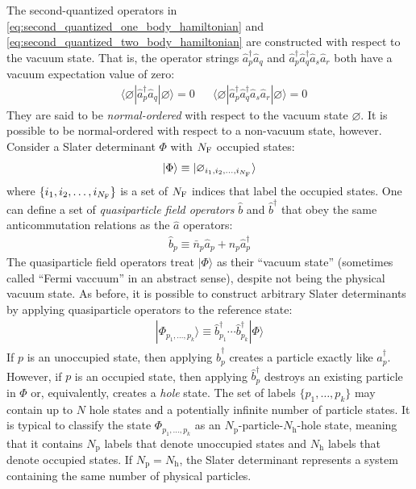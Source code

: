 \documentclass[amsmath, amssymb, aps, floatfix, nofootinbib, preprintnumbers,showpacs, superscriptaddress, twocolumn]{revtex4-1}
\newcommand{\ket}[1]{| #1 \rangle}
\newcommand{\bra}[1]{\langle #1 |}
\begin{document}
The second-quantized operators in \eqref{eq:second_quantized_one_body_hamiltonian} and \eqref{eq:second_quantized_two_body_hamiltonian} are constructed with respect to the vacuum state.  That is, the operator strings $\hat{a}_p^\dagger \hat{a}_q$ and $\hat{a}_p^\dagger \hat{a}_q^\dagger \hat{a}_s \hat{a}_r$ both have a vacuum expectation value of zero:
\begin{align*}
&\bra{\varnothing} \hat{a}_p^\dagger \hat{a}_q \ket{\varnothing} = 0 &
&\bra{\varnothing} \hat{a}_p^\dagger \hat{a}_q^\dagger \hat{a}_s \hat{a}_r \ket{\varnothing} = 0
\end{align*}
They are said to be \emph{normal-ordered} with respect to the vacuum state $\varnothing$.  It is possible to be normal-ordered with respect to a non-vacuum state, however.  Consider a Slater determinant $\Phi$ with $N_{\text F}$ occupied states:
\begin{align*}
  \ket{\Phi} \equiv \ket{\varnothing_{i_1, i_2, \ldots, i_{N_{\text F}}}}
\end{align*}
where $\{i_1, i_2, \ldots, i_{N_{\text F}}\}$ is a set of $N_{\text F}$ indices that label the occupied states.  One can define a set of \textit{quasiparticle field operators} $\hat b$ and $\hat b^\dagger$ that obey the same anticommutation relations as the $\hat a$ operators:
\begin{align*}
  \hat b_p \equiv \bar n_p \hat a_{p} + n_p \hat a_{p}^\dagger
\end{align*}
The quasiparticle field operators treat $\ket{\Phi}$ as their ``vacuum state'' (sometimes called ``Fermi vaccuum'' in an abstract sense), despite not being the physical vacuum state.  As before, it is possible to construct arbitrary Slater determinants by applying quasiparticle operators to the reference state:
\begin{align}
  \ket{\Phi_{p_1, \ldots, p_k}} \equiv \hat{b}^\dagger_{p_1} \cdots \hat{b}^\dagger_{p_k} \ket{\Phi}
  \label{eq:quasisd}
\end{align}
If $p$ is an unoccupied state, then applying $\hat{b}_p^\dagger$ creates a particle exactly like $\hat{a}_p^\dagger$.  However, if $p$ is an occupied state, then applying $\hat{b}_p^\dagger$ destroys an existing particle in $\Phi$ or, equivalently, creates a \textit{hole} state.  The set of labels $\{p_1, \ldots, p_k\}$ may contain up to $N$ hole states and a potentially infinite number of particle states.  It is typical to classify the state $\Phi_{p_1, \ldots, p_k}$ as an $N_{\text{p}}$-particle-$N_{\text{h}}$-hole state, meaning that it contains $N_{\text{p}}$ labels that denote unoccupied states and $N_{\text{h}}$ labels that denote occupied states.  If $N_{\text{p}} = N_{\text{h}}$, the Slater determinant represents a system containing the same number of physical particles.
\end{document}
